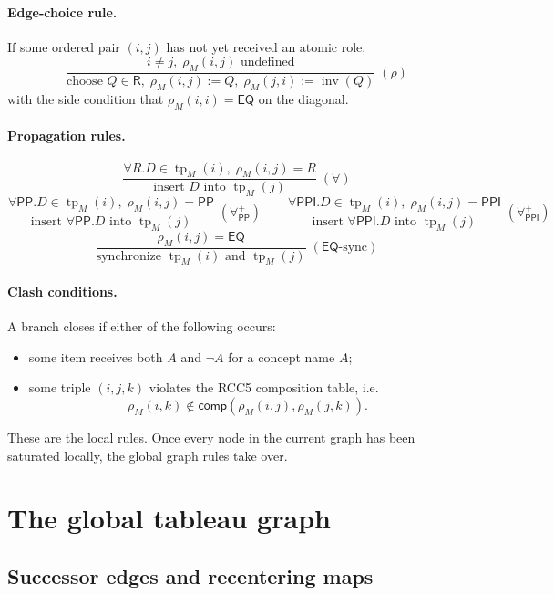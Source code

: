 \documentclass[11pt]{article}
\theoremstyle{definition}
\newcommand{\tp}{\operatorname{tp}}
\newcommand{\Roles}{\mathsf{R}}
\newcommand{\Eq}{\mathsf{EQ}}
\newcommand{\Pp}{\mathsf{PP}}
\newcommand{\Ppi}{\mathsf{PPI}}
\newcommand{\inv}{\operatorname{inv}}
\begin{document}
\paragraph{Edge-choice rule.}
If some ordered pair $(i,j)$ has not yet received an atomic role,
\[
\frac{i\neq j,\; \rho_M(i,j)\text{ undefined}}{\text{choose }Q\in \Roles,\; \rho_M(i,j):=Q,\; \rho_M(j,i):=\inv(Q)}\; (\rho)
\]
with the side condition that $\rho_M(i,i)=\Eq$ on the diagonal.

\paragraph{Propagation rules.}
\[
\frac{\forall R.D\in \tp_M(i),\; \rho_M(i,j)=R}{\text{insert }D\text{ into }\tp_M(j)}\; (\forall)
\]
\[
\frac{\forall \Pp.D\in \tp_M(i),\; \rho_M(i,j)=\Pp}{\text{insert }\forall \Pp.D\text{ into }\tp_M(j)}\; (\forall^+_{\Pp})
\qquad
\frac{\forall \Ppi.D\in \tp_M(i),\; \rho_M(i,j)=\Ppi}{\text{insert }\forall \Ppi.D\text{ into }\tp_M(j)}\; (\forall^+_{\Ppi})
\]
\[
\frac{\rho_M(i,j)=\Eq}{\text{synchronize }\tp_M(i)\text{ and }\tp_M(j)}\; (\Eq\text{-sync})
\]

\paragraph{Clash conditions.}
A branch closes if either of the following occurs:
\begin{itemize}
    \item some item receives both $A$ and $\neg A$ for a concept name $A$;
    \item some triple $(i,j,k)$ violates the RCC5 composition table, i.e.
    \[
    \rho_M(i,k)\notin \mathsf{comp}(\rho_M(i,j),\rho_M(j,k)).
    \]
\end{itemize}

These are the local rules. Once every node in the current graph has been saturated locally, the global graph rules take over.

\section{The global tableau graph}

\subsection{Successor edges and recentering maps}
\end{document}
